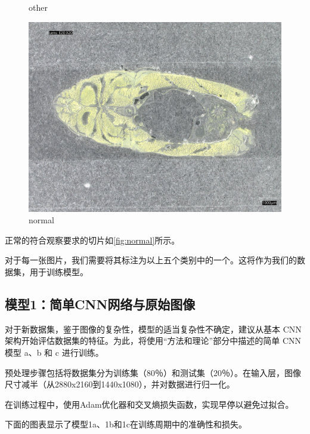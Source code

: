 \begin{figure}[H]
\begin{minipage}{0.32\textwidth}
        \caption{other}
        \label{fig:other}
    \end{minipage}
    \begin{minipage}{0.32\textwidth}
        \centering
        \includegraphics[width=\textwidth]{./fig/sample_1/normal.jpg}
        \caption{normal}
        \label{fig:normal}
    \end{minipage}
\end{figure}

正常的符合观察要求的切片如\autoref{fig:normal}所示。

对于每一张图片，我们需要将其标注为以上五个类别中的一个。这将作为我们的数据集，用于训练模型。

\subsection{模型1：简单CNN网络与原始图像}

对于新数据集，鉴于图像的复杂性，模型的适当复杂性不确定，建议从基本 CNN 架构开始评估数据集的特征。为此，将使用“方法和理论”部分中描述的简单 CNN 模型 a、b 和 c 进行训练。

预处理步骤包括将数据集分为训练集（80％）和测试集（20％）。在输入层，图像尺寸减半（从2880x2160到1440x1080），并对数据进行归一化。

在训练过程中，使用Adam优化器和交叉熵损失函数，实现早停以避免过拟合。

下面的图表显示了模型1a、1b和1c在训练周期中的准确性和损失。

